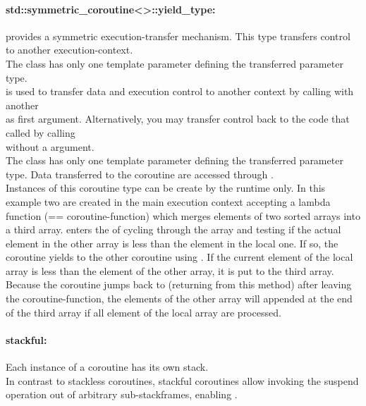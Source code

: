 \paragraph*{std::symmetric\_coroutine<>::yield\_type:}
provides a symmetric execution-transfer mechanism. This type transfers control
to another execution-context.\\
The class has only one template parameter defining the transferred parameter
type.\\
\yieldcoroop is used to transfer data and execution control to another context
by calling \yieldcoroop with another\\
\callcoro as first argument. Alternatively, you may transfer control back to the
code that called \callcoroop by calling\\
\yieldcoroop without a \callcoro argument.\\
\newline
The class has only one template parameter defining the transferred parameter
type. Data transferred to the coroutine are accessed through \yieldcoroget.\\
\newline
Instances of this coroutine type can be create by the runtime only.
In this example two \callcoro are created in the main execution context
accepting a lambda function (== coroutine-function) which merges elements of two
sorted arrays into a third array.  enters the \corofunction of
 cycling through the array and testing if the actual element in the
other array is less than the element in the local one. If so, the coroutine
yields to the other coroutine  using . If the
current element of the local array is less than the element of the other array,
it is put to the third array. Because the coroutine jumps back to 
(returning from this method) after leaving the coroutine-function, the elements
of the other array will appended at the end of the third array if all element of
the local array are processed. 

\paragraph*{stackful:}
Each instance of a coroutine has its own stack.\\
\newline
In contrast to stackless coroutines, stackful coroutines allow invoking the
suspend operation out of arbitrary sub-stackframes, enabling \escreops.

